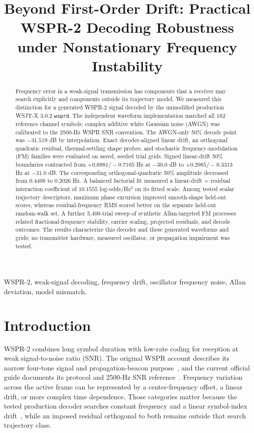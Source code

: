 \documentclass[conference]{IEEEtran}
\title{Beyond First-Order Drift: Practical WSPR-2 Decoding Robustness under Nonstationary Frequency Instability}
\author{}
\begin{document}
\maketitle

\begin{abstract}
Frequency error in a weak-signal transmission has components that a receiver may search explicitly and components outside its trajectory model. We measured this distinction for a generated WSPR-2 signal decoded by the unmodified production WSJT-X 3.0.2 \texttt{wsprd}. The independent waveform implementation matched all 162 reference channel symbols; complex additive white Gaussian noise (AWGN) was calibrated to the 2500-Hz WSPR SNR convention. The AWGN-only 50\% decode point was $-31.519$ dB by interpolation. Exact decoder-aligned linear drift, an orthogonal quadratic residual, thermal-settling shape probes, and stochastic frequency-modulation (FM) families were evaluated on saved, seeded trial grids. Signed linear-drift 50\% boundaries contracted from $+0.6981/-0.7105$ Hz at $-30.0$ dB to $+0.2985/-0.3313$ Hz at $-31.0$ dB. The corresponding orthogonal-quadratic 50\% amplitude decreased from $0.4408$ to $0.2026$ Hz. A balanced factorial fit measured a linear-drift $\times$ residual interaction coefficient of $10.1555$ log-odds/Hz$^2$ on its fitted scale. Among tested scalar trajectory descriptors, maximum phase excursion improved smooth-shape held-out scores, whereas residual-frequency RMS scored better on the separate held-out random-walk set. A further 5,400-trial sweep of synthetic Allan-targeted FM processes related fractional-frequency stability, carrier scaling, projected residuals, and decode outcomes. The results characterize this decoder and these generated waveforms and grids; no transmitter hardware, measured oscillator, or propagation impairment was tested.
\end{abstract}

\begin{IEEEkeywords}
WSPR-2, weak-signal decoding, frequency drift, oscillator frequency noise, Allan deviation, model mismatch.
\end{IEEEkeywords}

\section{Introduction}
WSPR-2 combines long symbol duration with low-rate coding for reception at weak signal-to-noise ratio (SNR). The original WSPR account describes its narrow four-tone signal and propagation-beacon purpose~\cite{taylor2010}, and the current official guide documents its protocol and 2500-Hz SNR reference~\cite{wsjtxguide}. Frequency variation across the active frame can be represented by a center-frequency offset, a linear drift, or more complex time dependence. Those categories matter because the tested production decoder searches constant frequency and a linear symbol-index drift~\cite{wsjtx302}, while an imposed residual orthogonal to both remains outside that search trajectory class.
\end{document}
